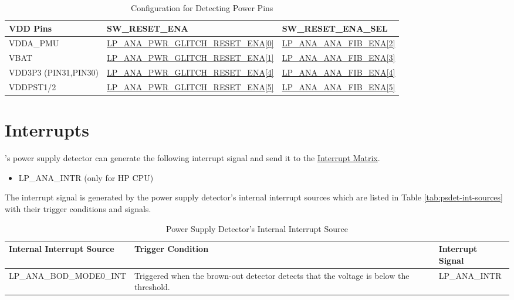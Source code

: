 \documentclass[main\_\_EN.tex]{subfiles}
\begin{document}
\begin{longtable}{ | l | l | l | }
\caption{Configuration for Detecting Power Pins} \label{tab:psdet-power-detec-pins}
\\ \hline
\rowcolor{lightgray}
\textbf{VDD Pins} & \textbf{SW\_RESET\_ENA}  &  \textbf{SW\_RESET\_ENA\_SEL}\\ \hline
VDDA\_PMU & \hyperref[fielddesc:LPANAPWRGLITCHRESETENA]{LP\_ANA\_PWR\_GLITCH\_RESET\_ENA[0]} & \hyperref[fielddesc:LPANAANAFIBENA]{LP\_ANA\_ANA\_FIB\_ENA[2]} \\\hline
VBAT & \hyperref[fielddesc:LPANAPWRGLITCHRESETENA]{LP\_ANA\_PWR\_GLITCH\_RESET\_ENA[1]} & \hyperref[fielddesc:LPANAANAFIBENA]{LP\_ANA\_ANA\_FIB\_ENA[3]} \\\hline
VDD3P3 (PIN31,PIN30) & \hyperref[fielddesc:LPANAPWRGLITCHRESETENA]{LP\_ANA\_PWR\_GLITCH\_RESET\_ENA[4]} & \hyperref[fielddesc:LPANAANAFIBENA]{LP\_ANA\_ANA\_FIB\_ENA[4]} \\\hline
VDDPST1/2 & \hyperref[fielddesc:LPANAPWRGLITCHRESETENA]{LP\_ANA\_PWR\_GLITCH\_RESET\_ENA[5]} & \hyperref[fielddesc:LPANAANAFIBENA]{LP\_ANA\_ANA\_FIB\_ENA[5]} \\\hline
\end{longtable}


\section{Interrupts}

\chipname{}'s power supply detector can generate the following interrupt signal and send it to the \hyperref[mod:intmtrx]{Interrupt Matrix}.

    \begin{itemize}
        \item LP\_ANA\_INTR (only for HP CPU)
    \end{itemize}

The interrupt signal is generated by the power supply detector's internal interrupt sources which are listed in Table \ref{tab:psdet-int-sources} with their trigger conditions and signals.

\begin{longtable}{ |l | L{7.3cm} | l | }
\caption{Power Supply Detector's Internal Interrupt Source} \label{tab:psdet-int-sources}
\\ \hline
{}
\textbf{Internal Interrupt Source} & \textbf{Trigger Condition}  &  \textbf{Interrupt Signal}\\ \hline
\label{int:LPANABODMODE0INT}LP\_ANA\_BOD\_MODE0\_INT  & Triggered when the brown-out detector detects that the voltage is below
the threshold.  & LP\_ANA\_INTR  \\ \hline
\end{longtable}
\end{document}
